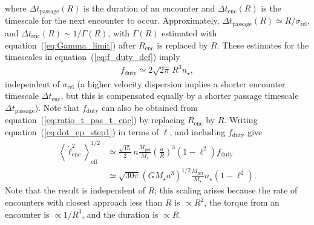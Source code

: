 \documentclass[iop,usenatbib]{emulateapj}
\newcommand{\renc}{R_\mathrm{enc}}
\newcommand{\mper}{M_\mathrm{per}}
\newcommand{\srel}{\sigma_\mathrm{rel}}
\begin{document}
where $\Delta t_\mathrm{passage}(R)$ is the duration of an encounter and $\Delta t_\mathrm{enc}(R)$ is the timescale for the next encounter to occur. Approximately, $\Delta t_\mathrm{passage}(R)\simeq R/\srel$, and $\Delta t_\mathrm{enc} (R)\sim 1/\Gamma(R)$, with $\Gamma(R)$ estimated with equation~(\ref{eq:Gamma_limit}) after $\renc$ is replaced by $R$. These estimates for the timescales in equation~(\ref{eq:f_duty_def}) imply
\begin{align}
\label{eq:f_duty}
f_\mathrm{duty} \simeq 2\sqrt{2\pi} \, R^3 n_\star,
\end{align}
independent of $\srel$ (a higher velocity dispersion implies a shorter encounter timescale  $\Delta t_\mathrm{enc}$, but this is compensated equally by a shorter passage timescale $\Delta t_\mathrm{passage}$). Note that $f_\mathrm{duty}$ can also be obtained from equation~(\ref{eq:ratio_t_pas_t_enc}) by replacing $\renc$ by $R$. Writing equation~(\ref{eq:dot_ep_step1}) in terms of $\ell$, and including $f_\mathrm{duty}$ give
\begin{align}
\label{eq:ell_p_dot_enc_est}
\nonumber \left \langle \dot{\ell}^2_\mathrm{enc}  \right \rangle^{1/2}_\mathrm{eff} &\simeq \frac{\sqrt{15}}{2} \, n \frac{\mper}{M_\star} \left ( \frac{a}{R} \right )^3 \left(1-\ell^2\right ) f_\mathrm{duty}\\
&\simeq \sqrt{30\pi} \left ( G M_\star a^3 \right )^{1/2} \frac{\mper}{M_\star} n_\star \left(1-\ell^2\right ).
\end{align}
Note that the result is independent of $R$; this scaling arises because the rate of encounters with closest approach less than $R$ is $\propto R^2$, the torque from an encounter is $\propto 1/R^3$, and the duration is $\propto R$.
\end{document}
